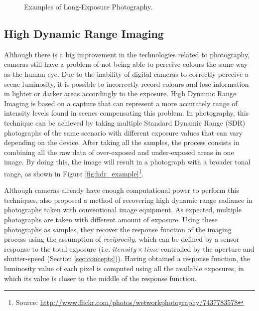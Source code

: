 \begin{figure}[htbp]
        \centering
  \caption{Examples of Long-Exposure Photography. \cite{kamps2012rules}}
  \label{fig:long_exposure_example}
\end{figure}

\subsection{High Dynamic Range Imaging}

Although there is a big improvement in the technologies related to photography, cameras still have a problem of not being able to perceive colours the same way as the human eye. Due to the inability of digital cameras to correctly perceive a scene luminosity, it is possible to incorrectly record colours and lose information in lighter or darker areas accordingly to the exposure. High Dynamic Range Imaging is based on a capture that can represent a more accurately range of intensity levels found in scenes compensating this problem.
In photography, this technique can be achieved by taking multiple Standard Dynamic Range (SDR) photographs of the same scenario with different exposure values that can vary depending on the device. After taking all the samples, the process consists in combining all the raw data of over-exposed and under-exposed areas in one image. By doing this, the image will result in a photograph with a broader tonal range, as shown in Figure \ref{fig:hdr_example}\footnote{Source: \url{http://www.flickr.com/photos/wetworkphotography/7437783578}}.

Although cameras already have enough computational power to perform this techniques, \citeauthor{debevec2008recovering} \cite{debevec2008recovering} also proposed a method of recovering high dynamic range radiance in photographs taken with conventional image equipment. 
As expected, multiple photographs are taken with different amount of exposure. Using these photographs as samples, they recover the response function of the imaging process using the assumption of \emph{reciprocity}, which can be defined by a sensor response to the total exposure (i.e. $itensity \times time$ controlled by the aperture and shutter-speed (Section \ref{sec:concepts})).
Having obtained a response function, the luminosity value of each pixel is computed using all the available exposures, in which its value is closer to the middle of the response function.

